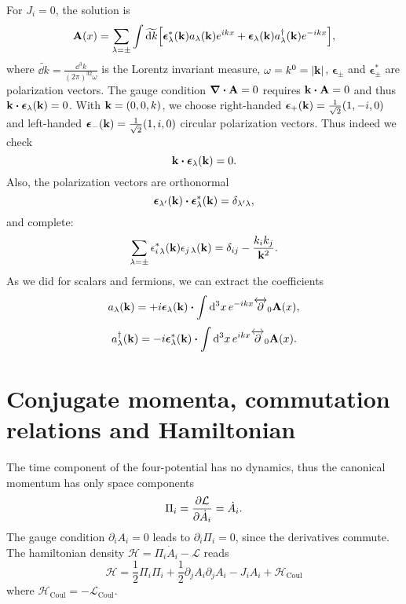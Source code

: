 For $J_i=0$, the solution is
\begin{equation}
    \vb{A}(x)=\sum_{\lambda=\pm}\int\widetilde{\dd k}\qty[\boldsymbol{\epsilon}^*_\lambda(\vb{k})a_\lambda(\vb{k})e^{ikx}+\boldsymbol{\epsilon}_\lambda(\vb{k})a_\lambda^\dagger(\vb{k})e^{-ikx}],
    \label{vector_mode_expansion}
\end{equation}
where $\widetilde{\dd k}=\frac{\dd ^3 k}{(2\pi)^32\omega}$ is the Lorentz invariant measure, $\omega=k^0=\abs{\vb{k}}$,  $\boldsymbol{\epsilon}_\pm$ and $\boldsymbol{\epsilon}^*_\pm$ are polarization vectors. The gauge condition $\div\vb{A}=0$ requires $\vb{k}\vdot\vb{A}=0$ and thus $\vb{k}\vdot \boldsymbol{\epsilon}_\lambda(\vb{k})=0$. With $\vb{k}=(0,0,k)$, we choose right-handed $\boldsymbol{\epsilon}_+(\vb{k})=\frac{1}{\sqrt{2}}(1,-i,0)$ and left-handed $\boldsymbol{\epsilon}_-(\vb{k})=\frac{1}{\sqrt{2}}(1,i,0)$ circular polarization vectors. Thus indeed we check
\begin{equation}
    \vb{k}\vdot\boldsymbol{\epsilon}_\lambda(\vb{k})=0.
\end{equation}
Also, the polarization vectors are orthonormal 
\begin{equation}
    \boldsymbol{\epsilon}_{\lambda^\prime}(\vb{k})\vdot\boldsymbol{\epsilon}^*_{\lambda}(\vb{k})=\delta_{\lambda^\prime\lambda},
\end{equation}
and complete:
\begin{equation}
    \sum_{\lambda=\pm}{\epsilon}^*_{i\,\lambda}(\vb{k}){\epsilon}_{j\,\lambda}(\vb{k})=\delta_{ij}-\frac{k_ik_j}{\vb{k}^2}.
\end{equation}
As we did for scalars and fermions, we can extract the coefficients 
\begin{equation}
    a_\lambda(\vb{k})=+i\boldsymbol{\epsilon}_\lambda(\vb{k})\vdot\int\dd^3 x\, e^{-ikx}\overleftrightarrow{\partial}_0\vb{A}(x),
    \label{a_photon}
\end{equation}
\begin{equation}
    a^\dagger_\lambda(\vb{k})=-i\boldsymbol{\epsilon}^*_\lambda(\vb{k})\vdot\int\dd^3 x\, e^{ikx}\overleftrightarrow{\partial}_0\vb{A}(x).
    \label{adagger_photon}
\end{equation}

\section{Conjugate momenta, commutation relations and Hamiltonian}
The time component of the four-potential has no dynamics, thus the canonical momentum has only space components
\begin{equation}
    \Pi_i=\pdv{\mathcal{L}}{\dot{A}_i}=\dot{A}_i.
\end{equation}
The gauge condition $\partial_iA_i=0$ leads to $\partial_i\Pi_i=0$, since the derivatives commute. The hamiltonian density $\mathcal{H}=\Pi_i\dot{A}_i-\mathcal{L}$ reads
\begin{equation}
   \mathcal{H}= \frac{1}{2}\Pi_i\Pi_i+\frac{1}{2}\partial_j A_i\partial_j A_i-J_iA_i+\mathcal{H}_{\text{Coul}}
\end{equation}
where $\mathcal{H}_{\text{Coul}}=-\mathcal{L}_{\text{Coul}}$.\\

